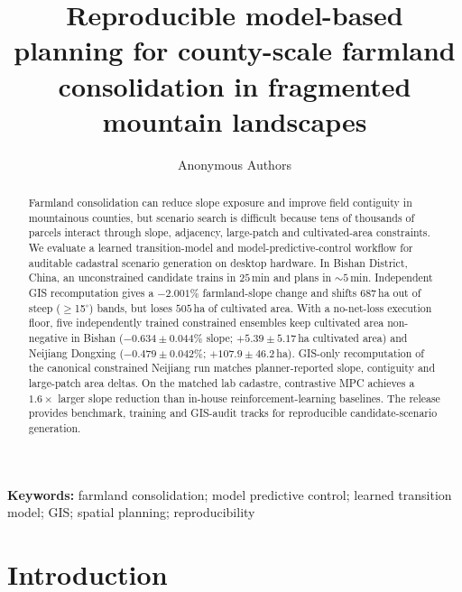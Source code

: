 \documentclass[11pt]{article}
\begin{document}
\title{Reproducible model-based planning for county-scale farmland consolidation in fragmented mountain landscapes}

\author{Anonymous Authors}
\maketitle
\sloppy  %
\linenumbers

\begin{abstract}
Farmland consolidation can reduce slope exposure and improve field contiguity in mountainous counties, but scenario search is difficult because tens of thousands of parcels interact through slope, adjacency, large-patch and cultivated-area constraints. We evaluate a learned transition-model and model-predictive-control workflow for auditable cadastral scenario generation on desktop hardware. In Bishan District, China, an unconstrained candidate trains in $25$\,min and plans in ${\sim}5$\,min. Independent GIS recomputation gives a $-2.001\%$ farmland-slope change and shifts $687$\,ha out of steep ($\geq$15$^\circ$) bands, but loses $505$\,ha of cultivated area. With a no-net-loss execution floor, five independently trained constrained ensembles keep cultivated area non-negative in Bishan ($-0.634 \pm 0.044\%$ slope; $+5.39 \pm 5.17$\,ha cultivated area) and Neijiang Dongxing ($-0.479 \pm 0.042\%$; $+107.9 \pm 46.2$\,ha). GIS-only recomputation of the canonical constrained Neijiang run matches planner-reported slope, contiguity and large-patch area deltas. On the matched lab cadastre, contrastive MPC achieves a $1.6\times$ larger slope reduction than in-house reinforcement-learning baselines. The release provides benchmark, training and GIS-audit tracks for reproducible candidate-scenario generation.
\end{abstract}

\noindent\textbf{Keywords:} farmland consolidation; model predictive control; learned transition model; GIS; spatial planning; reproducibility

\section{Introduction}\label{sec:intro}
\end{document}

